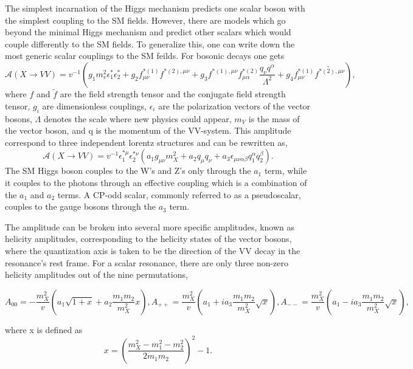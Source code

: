 The simplest incarnation of the Higgs mechanism predicts one scalar 
boson with the simplest coupling to the SM fields.  However, there are 
models which go beyond the minimal Higgs mechanism and predict other scalars
which would couple differently to the SM fields.  To generalize this, one 
can write down the most generic scalar couplings to the SM
feilds.  For bosonic decays one gets
\begin{equation}
  \mathscr{A}(X\to VV) = v^{-1}(g_1m_v^2\epsilon_1^*\epsilon_2^*+g_2f_{\mu\nu}^{*(1)}f^{*(2),\mu\nu}+g_3f^{*(1),\mu\nu}f_{\mu\alpha}^{*(2)}\frac{q_\nu q^\alpha}{\Lambda^2}+g_4f_{\mu\nu}^{*(1)}\tilde{f^{*(2),\mu\nu}}),
\label{eq:scalarAmp}
\end{equation}
where $f$ and $\tilde{f}$ are the field strength tensor and the conjugate field
strength tensor, $g_i$ are dimensionless couplings, $\epsilon_i$ are the 
polarization vectors of the vector bosons, $\Lambda$ denotes the scale where new
physics could appear, $m_V$ is the mass of the vector boson, and q is the
momentum of the VV-system.  
This amplitude correspond to three independent
lorentz structures and can be rewritten as,
\begin{equation}
\mathscr{A}(X\to VV) = v^{-1}\epsilon_1^{*\mu}\epsilon_2^{*\nu}(a_1g_{\mu\nu}m_X^2+a_2q_\mu q_\nu+a_3\epsilon_{\mu\nu\alpha\beta}q_1^{\alpha}q_2^{\beta}). 
\label{eq:masterEq}
\end{equation}
The SM Higgs boson couples to the W's and Z's only through the $a_1$ term,
while it couples to the photons through an effective coupling which is a 
combination of the $a_1$ and $a_2$ terms.  A CP-odd scalar, commonly referred 
to as a pseudoscalar, couples to the gauge bosons through the $a_3$ term.

The amplitude can be broken into several 
more specific amplitudes, known as helicity amplitudes, corresponding to the 
helicity states of the 
vector bosons, where the quantization axis is taken to be the direction
of the VV decay in the resonance's rest frame.  For a scalar
resonance, there are only three non-zero helicity amplitudes out of the 
nine permutations,
\begin{center}
\begin{subequations}
  \begin{equation}
    A_{00} = -\frac{m_X^2}{v}\left(a_1\sqrt{1+x}+a_2\frac{m_1m_2}{m_X^2}x\right),    \end{equation}
  \begin{equation}
    A_{++} = \frac{m_X^2}{v}\left(a_1+ia_3\frac{m_1m_2}{m_X^2}\sqrt{x}\right),
    \end{equation}
  \begin{equation}
    A_{--} = \frac{m_X^2}{v}\left(a_1-ia_3\frac{m_1m_2}{m_X^2}\sqrt{x}\right),
    \end{equation}
\end{subequations}
\end{center}
where x is defined as
\begin{equation}
x=(\frac{m_X^2-m_1^2-m_2^2}{2m_1m_2})^2-1.
\end{equation}

